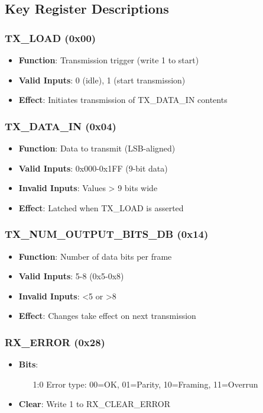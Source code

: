 \subsection{Key Register Descriptions}

\subsubsection{TX\_LOAD (0x00)}
\begin{itemize}
\item \textbf{Function}: Transmission trigger (write 1 to start)
\item \textbf{Valid Inputs}: 0 (idle), 1 (start transmission)
\item \textbf{Effect}: Initiates transmission of TX\_DATA\_IN contents
\end{itemize}

\subsubsection{TX\_DATA\_IN (0x04)}
\begin{itemize}
\item \textbf{Function}: Data to transmit (LSB-aligned)
\item \textbf{Valid Inputs}: 0x000-0x1FF (9-bit data)
\item \textbf{Invalid Inputs}: Values > 9 bits wide
\item \textbf{Effect}: Latched when TX\_LOAD is asserted
\end{itemize}

\subsubsection{TX\_NUM\_OUTPUT\_BITS\_DB (0x14)}
\begin{itemize}
\item \textbf{Function}: Number of data bits per frame
\item \textbf{Valid Inputs}: 5-8 (0x5-0x8)
\item \textbf{Invalid Inputs}: <5 or >8
\item \textbf{Effect}: Changes take effect on next transmission
\end{itemize}

\subsubsection{RX\_ERROR (0x28)}
\begin{itemize}
\item \textbf{Bits}:
  \begin{itemize}
  \item [1:0] Error type: 00=OK, 01=Parity, 10=Framing, 11=Overrun
  \end{itemize}
\item \textbf{Clear}: Write 1 to RX\_CLEAR\_ERROR
\end{itemize}


